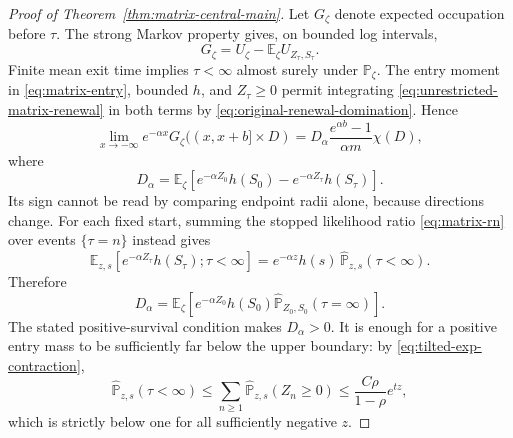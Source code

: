 \begin{proof}[Proof of Theorem~\ref{thm:matrix-central-main}]
Let $G_\zeta$ denote expected occupation before $\tau$.
The strong Markov property gives, on bounded log intervals,
\begin{equation}
 G_\zeta=U_\zeta-
 \mathbb E_\zeta U_{Z_\tau,S_\tau}.
 \label{eq:killed-subtraction}
\end{equation}
Finite mean exit time implies $\tau<\infty$ almost surely under
$\mathbb P_\zeta$. The entry moment in \eqref{eq:matrix-entry}, bounded
$h$, and $Z_\tau\ge0$ permit integrating
\eqref{eq:unrestricted-matrix-renewal} in both terms by
\eqref{eq:original-renewal-domination}. Hence
\begin{equation}
 \lim_{x\to-\infty}e^{-\alpha x}G_\zeta((x,x+b]\times D)
 = D_\alpha\frac{e^{\alpha b}-1}{\alpha m}\chi(D),
 \label{eq:killed-asymptotic}
\end{equation}
where
\begin{equation}
 D_\alpha=
 \mathbb E_\zeta\!\left[e^{-\alpha Z_0}h(S_0)
                 -e^{-\alpha Z_\tau}h(S_\tau)\right].
 \label{eq:matrix-central-constant}
\end{equation}
Its sign cannot be read by comparing endpoint radii alone, because
directions change. For each fixed start, summing the stopped likelihood
ratio \eqref{eq:matrix-rn} over events $\{\tau=n\}$ instead gives
\[
 \mathbb E_{z,s}[e^{-\alpha Z_\tau}h(S_\tau);\tau<\infty]
 =e^{-\alpha z}h(s)\,
   \widehat{\mathbb P}_{z,s}(\tau<\infty).
\]
Therefore
\begin{equation}
 D_\alpha=
 \mathbb E_\zeta\!\left[
 e^{-\alpha Z_0}h(S_0)
 \widehat{\mathbb P}_{Z_0,S_0}(\tau=\infty)\right].
 \label{eq:positive-constant}
\end{equation}
The stated positive-survival condition makes $D_\alpha>0$.
It is enough for a positive entry mass to be sufficiently far below
the upper boundary: by \eqref{eq:tilted-exp-contraction},
\[
 \widehat{\mathbb P}_{z,s}(\tau<\infty)
 \le \sum_{n\ge1}\widehat{\mathbb P}_{z,s}(Z_n\ge0)
 \le \frac{C\rho}{1-\rho}e^{tz},
\]
which is strictly below one for all sufficiently negative $z$.


\end{proof}
